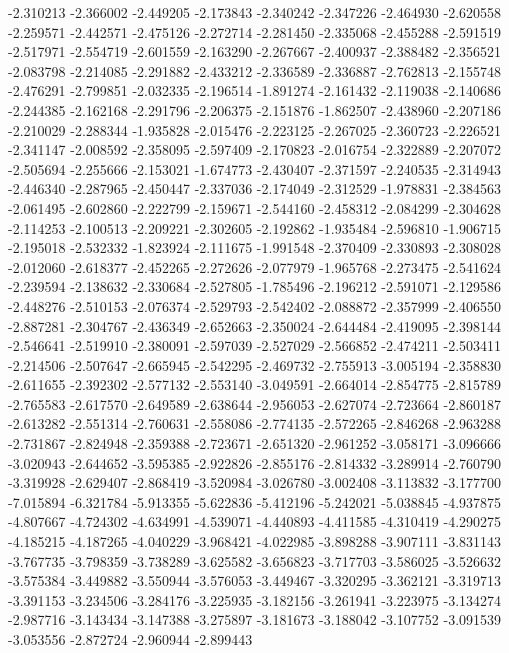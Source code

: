 -2.310213
-2.366002
-2.449205
-2.173843
-2.340242
-2.347226
-2.464930
-2.620558
-2.259571
-2.442571
-2.475126
-2.272714
-2.281450
-2.335068
-2.455288
-2.591519
-2.517971
-2.554719
-2.601559
-2.163290
-2.267667
-2.400937
-2.388482
-2.356521
-2.083798
-2.214085
-2.291882
-2.433212
-2.336589
-2.336887
-2.762813
-2.155748
-2.476291
-2.799851
-2.032335
-2.196514
-1.891274
-2.161432
-2.119038
-2.140686
-2.244385
-2.162168
-2.291796
-2.206375
-2.151876
-1.862507
-2.438960
-2.207186
-2.210029
-2.288344
-1.935828
-2.015476
-2.223125
-2.267025
-2.360723
-2.226521
-2.341147
-2.008592
-2.358095
-2.597409
-2.170823
-2.016754
-2.322889
-2.207072
-2.505694
-2.255666
-2.153021
-1.674773
-2.430407
-2.371597
-2.240535
-2.314943
-2.446340
-2.287965
-2.450447
-2.337036
-2.174049
-2.312529
-1.978831
-2.384563
-2.061495
-2.602860
-2.222799
-2.159671
-2.544160
-2.458312
-2.084299
-2.304628
-2.114253
-2.100513
-2.209221
-2.302605
-2.192862
-1.935484
-2.596810
-1.906715
-2.195018
-2.532332
-1.823924
-2.111675
-1.991548
-2.370409
-2.330893
-2.308028
-2.012060
-2.618377
-2.452265
-2.272626
-2.077979
-1.965768
-2.273475
-2.541624
-2.239594
-2.138632
-2.330684
-2.527805
-1.785496
-2.196212
-2.591071
-2.129586
-2.448276
-2.510153
-2.076374
-2.529793
-2.542402
-2.088872
-2.357999
-2.406550
-2.887281
-2.304767
-2.436349
-2.652663
-2.350024
-2.644484
-2.419095
-2.398144
-2.546641
-2.519910
-2.380091
-2.597039
-2.527029
-2.566852
-2.474211
-2.503411
-2.214506
-2.507647
-2.665945
-2.542295
-2.469732
-2.755913
-3.005194
-2.358830
-2.611655
-2.392302
-2.577132
-2.553140
-3.049591
-2.664014
-2.854775
-2.815789
-2.765583
-2.617570
-2.649589
-2.638644
-2.956053
-2.627074
-2.723664
-2.860187
-2.613282
-2.551314
-2.760631
-2.558086
-2.774135
-2.572265
-2.846268
-2.963288
-2.731867
-2.824948
-2.359388
-2.723671
-2.651320
-2.961252
-3.058171
-3.096666
-3.020943
-2.644652
-3.595385
-2.922826
-2.855176
-2.814332
-3.289914
-2.760790
-3.319928
-2.629407
-2.868419
-3.520984
-3.026780
-3.002408
-3.113832
-3.177700
-7.015894
-6.321784
-5.913355
-5.622836
-5.412196
-5.242021
-5.038845
-4.937875
-4.807667
-4.724302
-4.634991
-4.539071
-4.440893
-4.411585
-4.310419
-4.290275
-4.185215
-4.187265
-4.040229
-3.968421
-4.022985
-3.898288
-3.907111
-3.831143
-3.767735
-3.798359
-3.738289
-3.625582
-3.656823
-3.717703
-3.586025
-3.526632
-3.575384
-3.449882
-3.550944
-3.576053
-3.449467
-3.320295
-3.362121
-3.319713
-3.391153
-3.234506
-3.284176
-3.225935
-3.182156
-3.261941
-3.223975
-3.134274
-2.987716
-3.143434
-3.147388
-3.275897
-3.181673
-3.188042
-3.107752
-3.091539
-3.053556
-2.872724
-2.960944
-2.899443
